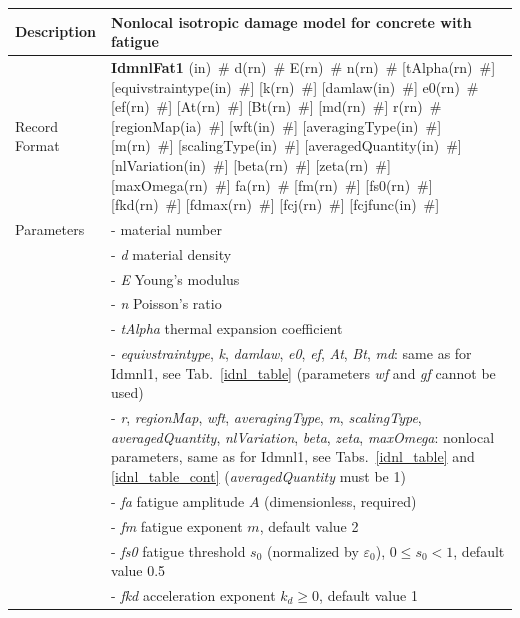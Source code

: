 \documentclass[a4paper]{article}
\newcommand{\descitem}[1]{{\noindent \bf #1}}
\newcommand{\elemparam}[2]{{{#1\tiny (#2)}~\#}}
\newcommand{\param}[1]{{\it #1}}
\begin{document}
\begin{longtable}{|l|p{9cm}|}
\hline
Description & Nonlocal isotropic damage model for concrete with fatigue\\
\hline
Record Format & \descitem{IdmnlFat1}
\elemparam{}{in}
\elemparam{d}{rn}
\elemparam{E}{rn}
\elemparam{n}{rn}
[\elemparam{tAlpha}{rn}]
[\elemparam{equivstraintype}{in}]
[\elemparam{k}{rn}]
[\elemparam{damlaw}{in}]
\elemparam{e0}{rn}
[\elemparam{ef}{rn}]
[\elemparam{At}{rn}]
[\elemparam{Bt}{rn}]
[\elemparam{md}{rn}]
\elemparam{r}{rn}
[\elemparam{regionMap}{ia}]
[\elemparam{wft}{in}]
[\elemparam{averagingType}{in}]
[\elemparam{m}{rn}]
[\elemparam{scalingType}{in}]
[\elemparam{averagedQuantity}{in}]
[\elemparam{nlVariation}{in}]
[\elemparam{beta}{rn}]
[\elemparam{zeta}{rn}]
[\elemparam{maxOmega}{rn}]
\elemparam{fa}{rn}
[\elemparam{fm}{rn}]
[\elemparam{fs0}{rn}]
[\elemparam{fkd}{rn}]
[\elemparam{fdmax}{rn}]
[\elemparam{fcj}{rn}]
[\elemparam{fcjfunc}{in}]\\
Parameters &- \param{} material number\\
&- \param{d} material density\\
&- \param{E} Young's modulus\\
&- \param{n} Poisson's ratio\\
&- \param{tAlpha} thermal expansion coefficient\\
&- \param{equivstraintype}, \param{k}, \param{damlaw}, \param{e0}, \param{ef}, \param{At}, \param{Bt}, \param{md}: same as for Idmnl1,
see Tab.~\ref{idnl_table} (parameters {\it wf} and {\it gf} cannot be used)\\
&- \param{r}, \param{regionMap}, \param{wft}, \param{averagingType}, \param{m}, \param{scalingType}, \param{averagedQuantity}, \param{nlVariation},
\param{beta}, \param{zeta}, \param{maxOmega}: nonlocal parameters, same as for Idmnl1, see Tabs.~\ref{idnl_table} and \ref{idnl_table_cont}
(\param{averagedQuantity} must be 1)\\
&- \param{fa} fatigue amplitude $A$ (dimensionless, required)\\
&- \param{fm} fatigue exponent $m$, default value 2\\
&- \param{fs0} fatigue threshold $s_0$ (normalized by $\varepsilon_0$), $0\le s_0<1$, default value 0.5\\
&- \param{fkd} acceleration exponent $k_d\ge 0$, default value 1\\

\end{longtable}
\end{document}
